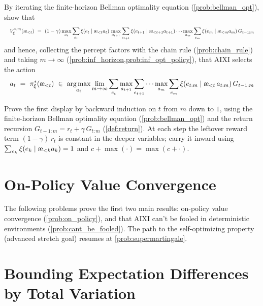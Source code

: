 \documentclass[fontsize=11pt, parskip=half]{scrartcl}
\DeclareMathOperator*{\argmax}{arg\,max}
\newcommand{\aes}{\textnormal{\ae}}
\begin{document}
\begin{exercise}
\label{prob:expectimax_derivation}
By iterating the finite-horizon Bellman optimality equation (\cref{prob:bellman_opt}), show that
\[
\resizebox{\textwidth}{!}{$\displaystyle
    V_\xi^{*,m}(\aes_{<t})
    ~=~ (1-\gamma) \max_{a_t} \sum_{e_t} \xi(e_t \mid \aes_{<t} a_t)\, \max_{a_{t+1}} \sum_{e_{t+1}} \xi(e_{t+1} \mid \aes_{<t+1} a_{t+1}) \cdots
    \max_{a_m} \sum_{e_m} \xi(e_m \mid \aes_{<m} a_m) \,G_{t-1:m}
$}
\]
and hence, collecting the percept factors with the chain rule (\cref{prob:chain_rule}) and taking $m \to \infty$ (\cref{prob:inf_horizon,prob:inf_opt_policy}), that AIXI selects the action
\[
\resizebox{\textwidth}{!}{$\displaystyle
    a_t ~=~ \pi_\xi^*(\aes_{<t})
    ~\in~ \argmax_{a_t} \lim_{m\to\infty} \sum_{e_t} \max_{a_{t+1}} \sum_{e_{t+1}} \cdots \max_{a_m} \sum_{e_m}
    \xi(e_{t:m} \mid \aes_{<t}\, a_{t:m}) \,G_{t-1:m} 
$}
\]


\begin{hint}
Prove the first display by backward induction on $t$ from $m$ down to $1$, using the finite-horizon Bellman optimality equation (\cref{prob:bellman_opt}) and the return recursion $G_{t-1:m} = r_t + \gamma\, G_{t:m}$ (\cref{def:return}). At each step the leftover reward term $(1-\gamma)\, r_t$ is constant in the deeper variables; carry it inward using $\sum_{e_k} \xi(e_k \mid \aes_{<k} a_k) = 1$ and $c + \max(\cdot) = \max(c + \cdot)$.
\end{hint}
\end{exercise}



\section*{On-Policy Value Convergence}

The following problems prove the first two main results: on-policy value convergence (\cref{prob:on_policy}), and that AIXI can't be fooled in deterministic environments (\cref{prob:cant_be_fooled}).
The path to the self-optimizing property (advanced stretch goal) resumes at \cref{prob:supermartingale}.

\section{Bounding Expectation Differences by Total Variation}\label{prob:tv_bound}
\end{document}
